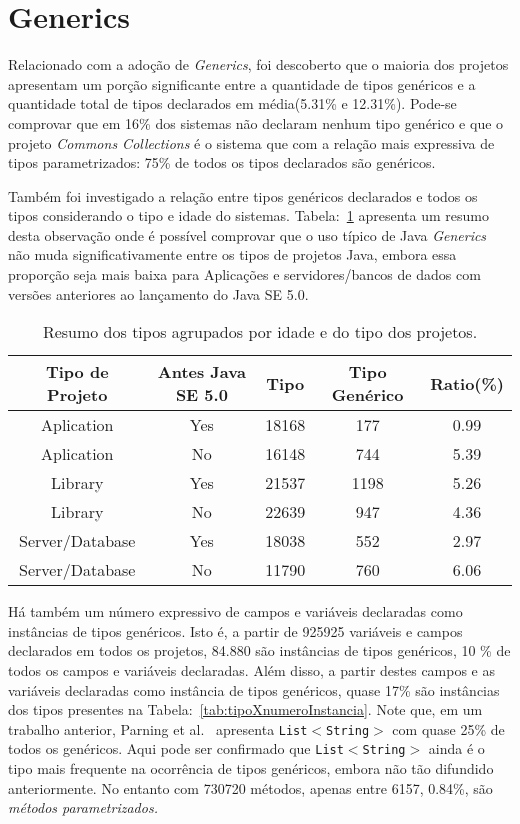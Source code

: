 \section{Generics}
Relacionado com a adoção de \textit{Generics}, foi descoberto que o maioria dos projetos apresentam um porção significante entre a quantidade de tipos genéricos e a quantidade total de tipos declarados em média(5.31\% e 12.31\%). Pode-se comprovar que em 16\% dos sistemas não declaram nenhum tipo genérico e que o projeto \textit{Commons Collections} é o sistema que com a relação mais expressiva de tipos parametrizados: 75\% de todos os tipos declarados são genéricos.

Também foi investigado a relação entre tipos genéricos declarados e todos os tipos considerando o tipo e idade do sistemas. Tabela:~\ref{tab:std} apresenta um resumo desta observação onde é possível comprovar que o uso típico de Java \textit{Generics} não muda significativamente entre os tipos de projetos Java, embora essa proporção seja mais baixa para Aplicações e servidores/bancos de dados com versões anteriores ao lançamento do Java SE 5.0.

\begin{table}[h]
	\centering
	\caption{Resumo dos tipos agrupados por idade e do tipo dos projetos.}
	\begin{tabular}{ccccc} \hline 
		Tipo de Projeto & Antes Java SE 5.0 & Tipo & Tipo Genérico & Ratio(\%) \\ \hline\hline
		Aplication & Yes & 18168 & 177 & 0.99 \\
		Aplication & No & 16148 & 744 & 5.39 \\
		Library & Yes & 21537 & 1198 & 5.26 \\
		Library & No & 22639 & 947 & 4.36 \\
		Server/Database & Yes & 18038 & 552 & 2.97 \\ 
		Server/Database & No & 11790 & 760 & 6.06 \\ \hline
	\end{tabular}
	\label{tab:std} %
\end{table}


Há também um número expressivo de campos e variáveis declaradas como instâncias de tipos genéricos. Isto é, a partir de 925925 variáveis e campos declarados em todos os projetos, 84.880 são instâncias de tipos genéricos, 10 \% de todos os campos e variáveis declaradas. Além disso, a partir destes campos e as variáveis declaradas como instância de tipos genéricos, quase 17\% são instâncias dos tipos presentes na Tabela:~\ref{tab:tipoXnumeroInstancia}. Note que, em um trabalho anterior, Parning et al.~\cite{Parnin:ACM2011} apresenta \texttt{List$<$String$>$} com quase 25\% de todos os genéricos. Aqui pode ser confirmado que \texttt{List$<$String$>$} ainda é o tipo mais frequente na ocorrência de tipos genéricos, embora não tão difundido anteriormente. No entanto com 730720 métodos, apenas entre 6157, 0.84\%, são \emph{métodos parametrizados.}

